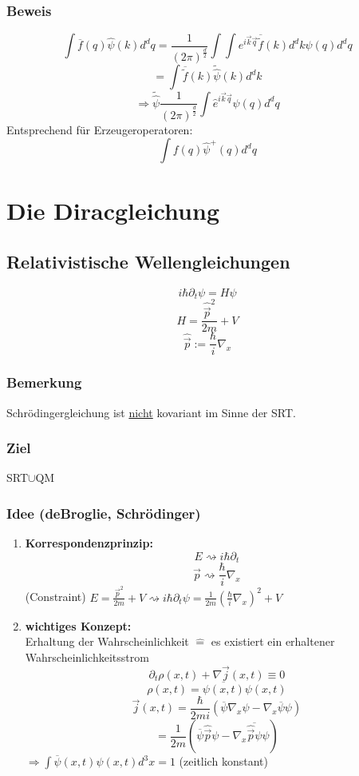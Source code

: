 \documentclass[twoside,a4paper]{scrartcl}
\renewcommand{\1}{\mathds{1}}
\newcommand{\Ra}{\Rightarrow}
\newcommand{\entspricht}{\mathrel{\widehat{=}}}
\begin{document}
\subsubsection*{Beweis}
$$\int \overline{f}(q) \hat \psi(k) d^dq=\frac{1}{(2\pi)^{\frac{d}{2}}} \int \int e^{i \vec k \vec q} \overline{\tilde{f}}(k) d^dk \hat \psi(q) d^dq$$
$$=\int \overline{\tilde{f}}(k) \tilde {\hat \psi}(k) d^dk $$
$$\Ra \tilde {\hat \psi} \frac{1}{(2\pi)^{\frac{d}{2}}}  \int  \hat e^{i \vec k \vec q} \psi(q) d^dq $$
Entsprechend für Erzeugeroperatoren:
$$\int f(q) \hat \psi^+(q)d^dq$$
% 

\section{Die Diracgleichung}
\subsection{Relativistische Wellengleichungen}
$$i\hbar \partial_t \psi=H\psi$$
$$H=\frac{\hat{\vec p}^2}{2m}+V$$
$$\hat{\vec p}:=\frac{\hbar}{i}\nabla_x$$
\subsubsection*{Bemerkung}
Schrödingergleichung ist \underline{nicht} kovariant im Sinne der SRT.
\subsubsection*{Ziel}
SRT$\cup$QM
\subsubsection*{Idee (deBroglie, Schrödinger)}
\begin{enumerate}
\item \textbf{Korrespondenzprinzip:}
$$E \rightsquigarrow i\hbar \partial_t$$
$$\vec p \rightsquigarrow \frac{\hbar}{i} \nabla_x$$
(Constraint) $E=\frac{\vec p^2}{2m}+V \rightsquigarrow  i\hbar \partial_t \psi=\frac{1}{2m}(\frac{\hbar}{i}\nabla_x)^2+V$
\item \textbf{wichtiges Konzept:}\\
Erhaltung der Wahrscheinlichkeit $\entspricht$ es existiert ein erhaltener Wahrscheinlichkeitsstrom
$$\partial_t \rho(x,t)+\nabla \vec j(x,t)\equiv0$$
$$\rho(x,t)=\overline{\psi(x,t)} \psi(x,t)$$
$$\vec j(x,t)=\frac{\hbar}{2mi}(\overline{\psi}\nabla_x \psi-\nabla_x \overline{\psi}\psi)$$
$$=\frac{1}{2m}(\overline{\psi} \hat{\vec p} \psi-\nabla_x \overline{\hat{\vec p}\psi}\psi)$$
$\Ra \int \overline{\psi}(x,t) \psi(x,t)d^3x=1$ (zeitlich konstant) 
\end{enumerate}
\end{document}

